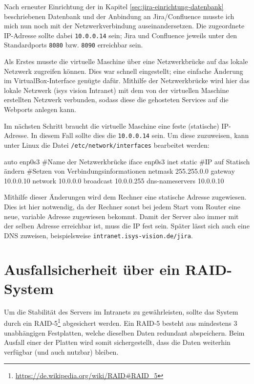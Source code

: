 Nach erneuter Einrichtung der in Kapitel \ref{sec:jira-einrichtung-datenbank} beschriebenen
Datenbank und der Anbindung an Jira/Confluence musste ich mich nun noch mit der
Netzwerkverbindung auseinandersetzen. Die zugeordnete IP-Adresse sollte dabei
\texttt{10.0.0.14} sein; Jira und Confluence jeweils unter den Standardports
\texttt{8080} bzw. \texttt{8090} erreichbar sein.

Als Erstes musste die virtuelle Maschine über eine Netzwerkbrücke auf das lokale
Netzwerk zugreifen können. Dies war schnell eingestellt; eine einfache Änderung
im VirtualBox-Interface genügte dafür. Mithilfe der Netzwerkbrücke wird hier das
lokale Netzwerk (isys vision Intranet) mit dem von der virtuellen Maschine erstellten
Netzwerk verbunden, sodass diese die gehosteten Services auf die Webports anlegen
kann.

Im nächsten Schritt braucht die virtuelle Maschine eine feste (statische) IP-Adresse.
In diesem Fall sollte dies die \texttt{10.0.0.14} sein. Um diese zuzuweisen, kann
unter Linux die Datei \texttt{/etc/network/interfaces} bearbeitet werden:

\begin{code}[language=bash, caption={Änderungen in \texttt{/etc/network/interfaces}}]
auto enp0s3 #Name der Netzwerkbrücke
iface enp0s3 inet static #IP auf Statisch ändern
#Setzen von Verbindungsinformationen
netmask 255.255.0.0
gateway 10.0.0.10
network 10.0.0.0
broadcast 10.0.0.255
dns-nameservers 10.0.0.10
\end{code}

Mithilfe dieser Änderungen wird dem Rechner eine statische Adresse zugewiesen. Dies
ist hier notwendig, da der Rechner sonst bei jedem Start vom Router eine neue, variable
Adresse zugewiesen bekommt. Damit der Server also immer mit der selben Adresse erreichbar
ist, muss die IP fest sein. Später lässt sich auch eine DNS zuweisen, beispielsweise
\texttt{intranet.isys-vision.de/jira}.



\section{Ausfallsicherheit über ein RAID-System}
\label{sec:jira-raid}

Um die Stabilität des Servers im Intranets zu gewährleisten, sollte das System durch
ein RAID-5\footnote{\url{https://de.wikipedia.org/wiki/RAID\#RAID\_5}} abgesichert
werden. Ein RAID-5 besteht aus mindestens 3 unabhängigen Festplatten, welche dieselben
Daten redundant abspeichern. Beim Ausfall einer der Platten wird somit sichergestellt,
dass die Daten weiterhin verfügbar (und auch nutzbar) bleiben.

